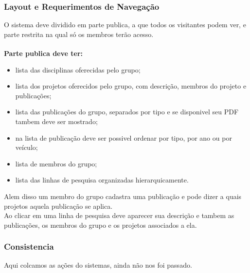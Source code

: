 \documentclass[11pt, a4paper]{article}
\begin{document}
			\subsubsection{Layout e Requerimentos de Navegação}
				O sistema deve dividido em parte publica, a que todos os 
				visitantes podem ver, e parte restrita na qual só os membros 
				terão acesso.\\
				\\
				\noindent \textbf{Parte publica deve ter:}
				\begin{itemize}
					\item lista das disciplinas oferecidas pelo grupo;
					\item lista dos projetos oferecidos pelo grupo, com 
					descrição, membros do projeto e publicações;
					\item lista das publicações do grupo, separados por tipo e 
					se disponivel seu PDF tambem deve ser mostrado;
					\item na lista de publicação deve ser possivel ordenar por 
					tipo, por ano ou por veículo;
					\item lista de  membros do grupo;
					\item lista das linhas de pesquisa organizadas 
					hierarquicamente.
				\end{itemize}
				
				\indent Alem disso um membro do grupo cadastra uma publicação e
				pode dizer a quais projetos aquela publicação se aplica.\\
				\indent Ao clicar em uma linha de pesquisa deve aparecer sua 
				descrição e tambem as publicações, os membros do grupo e os 
				projetos associados a ela.
							
			\subsubsection{Consistencia}
				Aqui colcamos as ações do sistemas, ainda não nos foi passado.
\end{document}
